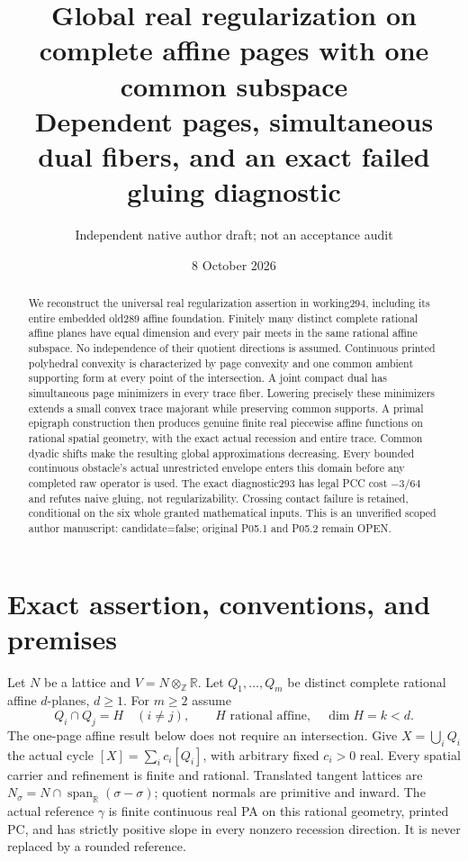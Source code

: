 \documentclass[11pt]{article}
\title{Global real regularization on complete affine pages with one common subspace\\\large Dependent pages, simultaneous dual fibers, and an exact failed gluing diagnostic}
\author{Independent native author draft; not an acceptance audit}
\date{8 October 2026}
\newcommand{\R}{\mathbb R}
\newcommand{\Z}{\mathbb Z}
\begin{document}
\maketitle
\begin{abstract}
We reconstruct the universal real regularization assertion in working294, including its entire embedded old289 affine foundation. Finitely many distinct complete rational affine planes have equal dimension and every pair meets in the same rational affine subspace. No independence of their quotient directions is assumed. Continuous printed polyhedral convexity is characterized by page convexity and one common ambient supporting form at every point of the intersection. A joint compact dual has simultaneous page minimizers in every trace fiber. Lowering precisely these minimizers extends a small convex trace majorant while preserving common supports. A primal epigraph construction then produces genuine finite real piecewise affine functions on rational spatial geometry, with the exact actual recession and entire trace. Common dyadic shifts make the resulting global approximations decreasing. Every bounded continuous obstacle's actual unrestricted envelope enters this domain before any completed raw operator is used. The exact diagnostic293 has legal PCC cost $-3/64$ and refutes naive gluing, not regularizability. Crossing contact failure is retained, conditional on the six whole granted mathematical inputs. This is an unverified scoped author manuscript: candidate=false; original P05.1 and P05.2 remain OPEN.
\end{abstract}
\tableofcontents

\section{Exact assertion, conventions, and premises}\label{sec:scope}
Let $N$ be a lattice and $V=N\otimes_\Z\R$. Let $Q_1,\ldots,Q_m$ be distinct complete rational affine $d$-planes, $d\geq1$. For $m\geq2$ assume
\[
 Q_i\cap Q_j=H\quad(i\ne j),\qquad H\text{ rational affine},\quad \dim H=k<d.
\]
The one-page affine result below does not require an intersection. Give $X=\bigcup_iQ_i$ the actual cycle $[X]=\sum_i c_i[Q_i]$, with arbitrary fixed $c_i>0$ real. Every spatial carrier and refinement is finite and rational. Translated tangent lattices are $N_\sigma=N\cap\operatorname{span}_\R(\sigma-\sigma)$; quotient normals are primitive and inward. The actual reference $\gamma$ is finite continuous real PA on this rational geometry, printed PC, and has strictly positive slope in every nonzero recession direction. It is never replaced by a rounded reference.
\end{document}
